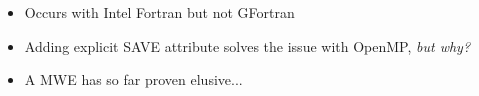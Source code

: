 \documentclass{beamer}
\begin{document}
\begin{frame}
{\begin{itemize}
      \item Occurs with Intel Fortran but not GFortran
      \item Adding explicit SAVE attribute solves the issue with OpenMP, \emph{but why?}
      \item A MWE has so far proven elusive...
    \end{itemize}
    }
\end{frame}
\end{document}
